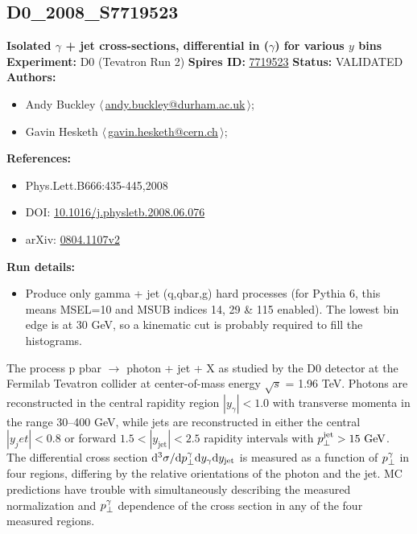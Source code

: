 \subsection[D0\_2008\_S7719523]{D0\_2008\_S7719523\,\cite{Abazov:2008er}}
\textbf{Isolated $\gamma$ + jet cross-sections, differential in \pT($\gamma$) for various $y$ bins}\newline
\textbf{Experiment:} D0 (Tevatron Run 2) \newline
\textbf{Spires ID:} \href{http://www.slac.stanford.edu/spires/find/hep/www?rawcmd=key+7719523}{7719523}\newline
\textbf{Status:} VALIDATED\newline
\textbf{Authors:}
\begin{itemize}
  \item Andy Buckley $\langle\,$\href{mailto:andy.buckley@durham.ac.uk}{andy.buckley@durham.ac.uk}$\,\rangle$;
  \item Gavin Hesketh $\langle\,$\href{mailto:gavin.hesketh@cern.ch}{gavin.hesketh@cern.ch}$\,\rangle$;
\end{itemize}
\textbf{References:}
\begin{itemize}
  \item Phys.Lett.B666:435-445,2008
  \item DOI: \href{http://dx.doi.org/10.1016/j.physletb.2008.06.076}{10.1016/j.physletb.2008.06.076}
  \item arXiv: \href{http://arxiv.org/abs/0804.1107v2}{0804.1107v2}
\end{itemize}
\textbf{Run details:}
\begin{itemize}

  \item Produce only gamma + jet (q,qbar,g) hard processes (for Pythia 6, this means MSEL=10  and MSUB indices 14, 29 \& 115 enabled). The lowest bin edge is at 30 GeV, so a kinematic  \pTmin cut is probably required to fill the histograms.\end{itemize}

\noindent The process p pbar \ensuremath{\to} photon + jet + X as studied by the D0 detector at the Fermilab Tevatron collider at center-of-mass energy \ensuremath{\sqrt{s}} = 1.96 TeV. Photons are reconstructed in the central rapidity region $|y_\gamma| < 1.0$ with transverse momenta in the range 30--400 GeV, while jets are reconstructed in either the central $|y_jet| < 0.8$ or forward $1.5 < |y_\text{jet}| < 2.5$ rapidity intervals with $p_\perp^\text{jet} > 15~\text{GeV}$. The differential cross section $\mathrm{d}^3 \sigma / \mathrm{d}{p_\perp^\gamma} \mathrm{d}{y_\gamma} \mathrm{d}{y_\text{jet}}$ is measured as a function of $p_\perp^\gamma$ in four regions, differing by the relative orientations of the photon and the jet.  MC predictions have trouble with simultaneously describing the measured normalization and $p_\perp^\gamma$ dependence of the cross section in any of the four measured regions.

